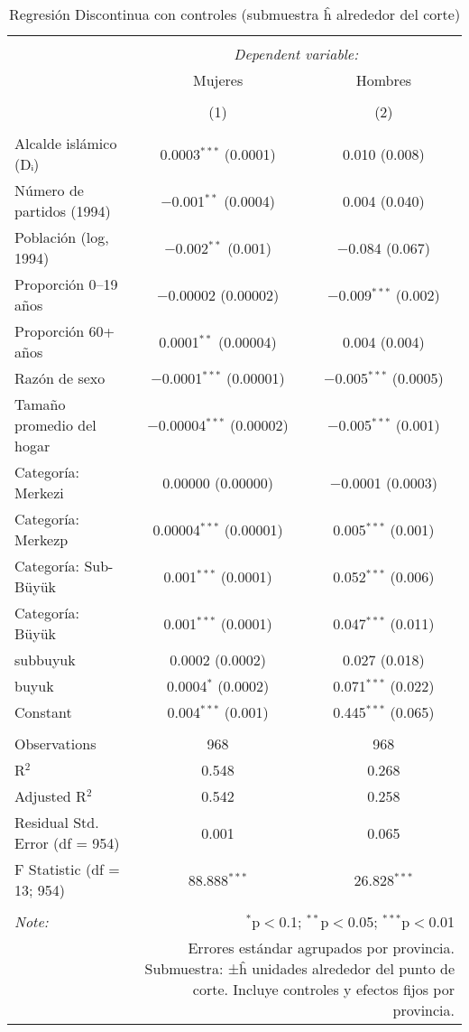 
\begin{table}[ht!] \centering 
  \caption{Regresión Discontinua con controles (submuestra ĥ alrededor del corte)} 
  \label{tab:rd_submuestra_h_mujeres_hombres} 
\begin{tabular}{@{\extracolsep{5pt}}lcc} 
\\[-1.8ex]\hline 
\hline \\[-1.8ex] 
 & \multicolumn{2}{c}{\textit{Dependent variable:}} \\ 
\cline{2-3} 
 & Mujeres & Hombres \\ 
\\[-1.8ex] & (1) & (2)\\ 
\hline \\[-1.8ex] 
 Alcalde islámico (Dᵢ) & 0.0003$^{***}$ (0.0001) & 0.010 (0.008) \\ 
  Número de partidos (1994) & $-$0.001$^{**}$ (0.0004) & 0.004 (0.040) \\ 
  Población (log, 1994) & $-$0.002$^{**}$ (0.001) & $-$0.084 (0.067) \\ 
  Proporción 0–19 años & $-$0.00002 (0.00002) & $-$0.009$^{***}$ (0.002) \\ 
  Proporción 60+ años & 0.0001$^{**}$ (0.00004) & 0.004 (0.004) \\ 
  Razón de sexo & $-$0.0001$^{***}$ (0.00001) & $-$0.005$^{***}$ (0.0005) \\ 
  Tamaño promedio del hogar & $-$0.00004$^{***}$ (0.00002) & $-$0.005$^{***}$ (0.001) \\ 
  Categoría: Merkezi & 0.00000 (0.00000) & $-$0.0001 (0.0003) \\ 
  Categoría: Merkezp & 0.00004$^{***}$ (0.00001) & 0.005$^{***}$ (0.001) \\ 
  Categoría: Sub-Büyük & 0.001$^{***}$ (0.0001) & 0.052$^{***}$ (0.006) \\ 
  Categoría: Büyük & 0.001$^{***}$ (0.0001) & 0.047$^{***}$ (0.011) \\ 
  subbuyuk & 0.0002 (0.0002) & 0.027 (0.018) \\ 
  buyuk & 0.0004$^{*}$ (0.0002) & 0.071$^{***}$ (0.022) \\ 
  Constant & 0.004$^{***}$ (0.001) & 0.445$^{***}$ (0.065) \\ 
 \hline \\[-1.8ex] 
Observations & 968 & 968 \\ 
R$^{2}$ & 0.548 & 0.268 \\ 
Adjusted R$^{2}$ & 0.542 & 0.258 \\ 
Residual Std. Error (df = 954) & 0.001 & 0.065 \\ 
F Statistic (df = 13; 954) & 88.888$^{***}$ & 26.828$^{***}$ \\ 
\hline 
\hline \\[-1.8ex] 
\textit{Note:}  & \multicolumn{2}{r}{$^{*}$p$<$0.1; $^{**}$p$<$0.05; $^{***}$p$<$0.01} \\ 
 & \multicolumn{2}{r}{Errores estándar agrupados por provincia. Submuestra: ±ĥ unidades alrededor del punto de corte. Incluye controles y efectos fijos por provincia.} \\ 
\end{tabular} 
\end{table} 

